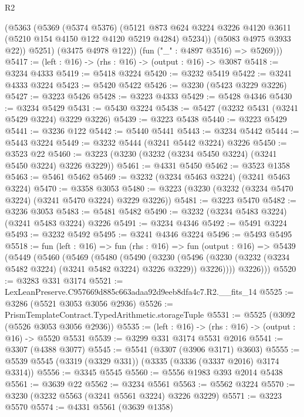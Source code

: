 \begin{lexlean}{R2}
\begin{coremodule}
            (@5363
              (@5369
                (@5374 @5376)
                (@5121
                  @873
                  @624
                  @3224
                  @3226
                  @4120
                  @3611
                  (@5210 @154 @4150 @122 @4120 @5219 @4284)
                  @5234))
              (@5083 @4975 @3933 @22))
            @5251)
          (@3475 @4978 @122))
        (fun ("_" : @4897 @3516) => @5269)))
@5417 := (left : @16) -> (rhs : @16) -> (output : @16) -> @3087
@5418 := @3234 @4333
@5419 := @5418 @3224
@5420 := @3232 @5419
@5422 := @3241 @4333 @3224
@5423 := @5420 @5422
@5426 := @3230 (@5423 @3229 @3226)
@5427 := @3223 @5426
@5428 := @3223 @4333
@5429 := @5428 @4346
@5430 := @3234 @5429
@5431 := @5430 @3224
@5438 := @5427 (@3232 @5431 (@3241 @5429 @3224) @3229 @3226)
@5439 := @3223 @5438
@5440 := @3223 @5429
@5441 := @3236 @122
@5442 := @5440 @5441
@5443 := @3234 @5442
@5444 := @5443 @3224
@5449 := @3232 @5444 (@3241 @5442 @3224) @3226
@5450 := @3523 @22
@5460 := @3223 (@3230 (@3232 (@3234 @5450 @3224) (@3241 @5450 @3224) @3226 @3229))
@5461 := @4331 @5450
@5462 := @3523 @1358
@5463 := @5461 @5462
@5469 := @3232 (@3234 @5463 @3224) (@3241 @5463 @3224)
@5470 := @3358 @3053
@5480 := @3223 (@3230 (@3232 (@3234 @5470 @3224) (@3241 @5470 @3224) @3229 @3226))
@5481 := @3223 @5470
@5482 := @3236 @3053
@5483 := @5481 @5482
@5490 := @3232 (@3234 @5483 @3224) (@3241 @5483 @3224) @3226
@5491 := @3234 @4346
@5492 := @5491 @3224
@5493 := @3232 @5492
@5495 := @3241 @4346 @3224
@5496 := @5493 @5495
@5518 := fun (left : @16) =>
  fun (rhs : @16) =>
  fun (output : @16) =>
  @5439
    (@5449
      (@5460
        (@5469
          (@5480
            (@5490
              (@3230
                (@5496 (@3230 (@3232 (@3234 @5482 @3224) (@3241 @5482 @3224) @3226 @3229)) @3226))))
          @3226)))
@5520 := @3283 @331 @3174
@5521 := LexLeanPreserve.C957669d885c663adaa92d9eeb8dfa4c7.R2.__fits_14
@5525 := @3286 (@5521 @3053 @3056 @2936)
@5526 := PrismTemplateContract.TypedArithmetic.storageTuple
@5531 := @5525 (@3092 (@5526 @3053 @3056 @2936))
@5535 := (left : @16) -> (rhs : @16) -> (output : @16) -> @5520 @5531
@5539 := @3299 @331 @3174 @5531 @2016
@5541 := @3307 (@4388 @3077)
@5545 := @5541 (@3307 (@3906 @3171) @3603)
@5555 := @5539 @5545 (@3319 (@3329 @331)) (@3335 (@3336 (@3337 @2016) @3174 @3314))
@5556 := @3345 @5545
@5560 := @5556 @1983 @393 @2014 @5438
@5561 := @3639 @22
@5562 := @3234 @5561
@5563 := @5562 @3224
@5570 := @3230 (@3232 @5563 (@3241 @5561 @3224) @3226 @3229)
@5571 := @3223 @5570
@5574 := @4331 @5561 (@3639 @1358)

\end{coremodule}
\end{lexlean}
